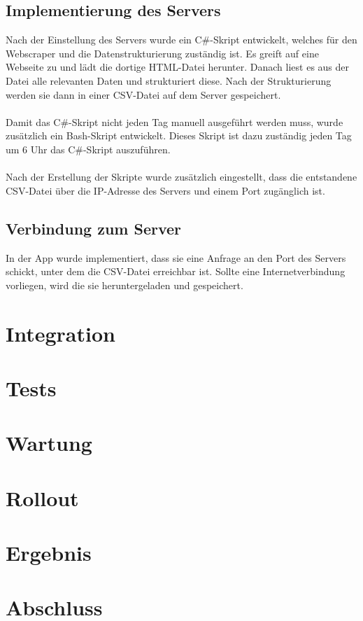 \documentclass[conference]{IEEEtran}
\begin{document}
\subsection{Implementierung des Servers}
Nach der Einstellung des Servers wurde ein C\#-Skript entwickelt, welches für den Webscraper und die Datenstrukturierung zuständig ist. Es greift  auf eine Webseite zu und lädt die dortige HTML-Datei herunter. Danach liest es aus der Datei alle relevanten Daten und strukturiert diese. Nach der Strukturierung werden sie dann in einer CSV-Datei auf dem Server gespeichert. \\\\ Damit das C\#-Skript nicht jeden Tag manuell ausgeführt werden muss, wurde zusätzlich ein Bash-Skript entwickelt. Dieses Skript ist dazu zuständig jeden Tag um 6 Uhr das C\#-Skript auszuführen. \\\\ Nach der Erstellung der Skripte wurde zusätzlich eingestellt, dass die entstandene CSV-Datei über die IP-Adresse des Servers und einem Port zugänglich ist.

\subsection{Verbindung zum Server}
In der App wurde implementiert, dass sie eine Anfrage an den Port des Servers schickt, unter dem die CSV-Datei erreichbar ist. Sollte eine Internetverbindung vorliegen, wird die sie heruntergeladen und gespeichert.

\section{Integration}

\section{Tests}

\section{Wartung}

\section{Rollout}

\section{Ergebnis}

\section{Abschluss}
\end{document}
